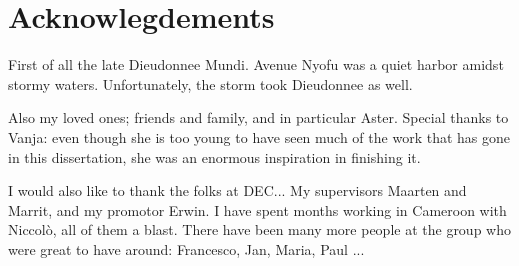 \chapter*{Acknowlegdements}
First of all the late Dieudonnee Mundi. Avenue Nyofu was a quiet harbor amidst stormy waters. Unfortunately, the storm took Dieudonnee as well.


Also my loved ones; friends and family, and in particular Aster. Special thanks to Vanja: even though she is too young to have seen much of the work that has gone in this dissertation, she was an enormous inspiration in finishing it.



I would also like to thank the folks at DEC... My supervisors Maarten and Marrit, and my promotor Erwin. I have spent months working in Cameroon with Niccolò, all of them a blast. There have been many more people at the group who were great to have around: Francesco, Jan, Maria, Paul ...




